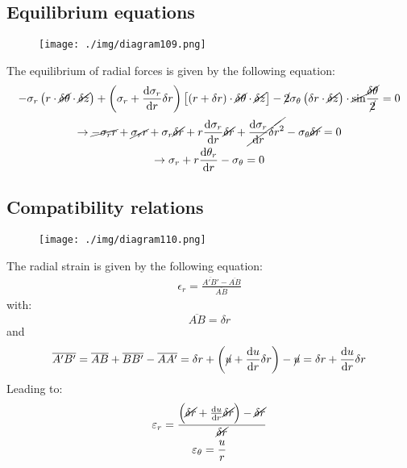 \subsection{Equilibrium equations}
\begin{figure}[H]
  \centering
  \texttt{[image: ./img/diagram109.png]}
  \caption{}
\end{figure}
The equilibrium of radial forces is given by the following equation:
\begin{gather}
  -\sigma_r \left(r\cdot \cancel{\delta \theta} \cdot \cancel{\delta z}\right) + \left(\sigma_r + \frac{\dif \sigma_r}{\dif r}\delta r \right) \left[ \left(r + \delta r \right) \cdot \cancel{\delta \theta} \cdot \cancel{\delta z}\right] - \cancel{2} \sigma_{\theta} \left(\delta r \cdot \cancel{\delta z}\right) \cdot \cancel{\sin} \frac{\cancel{\delta \theta}}{\cancel{2}} = 0\\
  \rightarrow \cancel{-\sigma_r r} + \cancel{\sigma_r r} + \sigma_r \cancel{\delta r} + r \frac{\dif \sigma_r}{\dif r} \cancel{\delta r} + \cancel{\frac{\dif \sigma_r}{\dif r}\delta r^2} - \sigma_{\theta} \cancel{\delta r} = 0\\
  \rightarrow \sigma_r + r\frac{\dif \theta_r}{\dif r} - \sigma_{\theta} = 0
\end{gather}
\subsection{Compatibility relations}
\begin{figure}[H]
  \centering
  \texttt{[image: ./img/diagram110.png]}
  \caption{}
\end{figure}
The radial strain is given by the following equation:
\begin{gather}
  \epsilon_r = \frac{\overline{A'B'} - \overline{AB}}{\overline{AB}}
\end{gather}
with:
\begin{equation}
  \overline{AB} = \delta r
\end{equation}
and
\begin{equation}
  \overline{A'B'} = \overline{AB} + \overline{BB'} - \overline{AA'} = \delta r + \left(\cancel{u} + \frac{\dif u}{\dif r} \delta r \right) - \cancel{u} = \delta r + \frac{\dif u}{\dif r} \delta r
\end{equation}
Leading to:
\begin{gather}
  \varepsilon_r = \frac{\left(\cancel{\delta r}+ \frac{\dif u }{\dif r} \cancel{\delta r}\right) - \cancel{\delta r}}{\cancel{\delta r}}\\
  \varepsilon_{\theta} = \frac{u}{r}
\end{gather}
